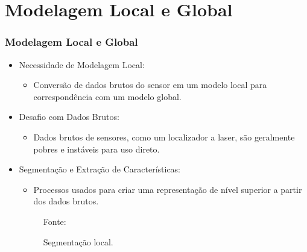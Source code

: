 \documentclass[xcolor=dvipsnames, aspectratio=169]{beamer}
\begin{document}
\section{Modelagem Local e Global}
\begin{frame}
  \frametitle{Modelagem Local e Global}
  \begin{itemize}
      \item Necessidade de Modelagem Local: 
      \begin{itemize}
        \item Conversão de dados brutos do sensor em um modelo local para correspondência com um modelo global.
      \end{itemize}
      \item Desafio com Dados Brutos:
      \begin{itemize}
        \item Dados brutos de sensores, como um localizador a laser, são geralmente pobres e instáveis para uso direto.
      \end{itemize}
      \item Segmentação e Extração de Características:
      \begin{itemize}
        \item Processos usados para criar uma representação de nível superior a partir dos dados brutos.
      \end{itemize}
      \begin{figure}
        \centering
        {Fonte: \cite{buniyamin2011simple}}
        \caption{Segmentação local.}
        \label{fig:1_range_sensor_obstacle}
      \end{figure}
  \end{itemize}
\end{frame}
  
\end{document}
